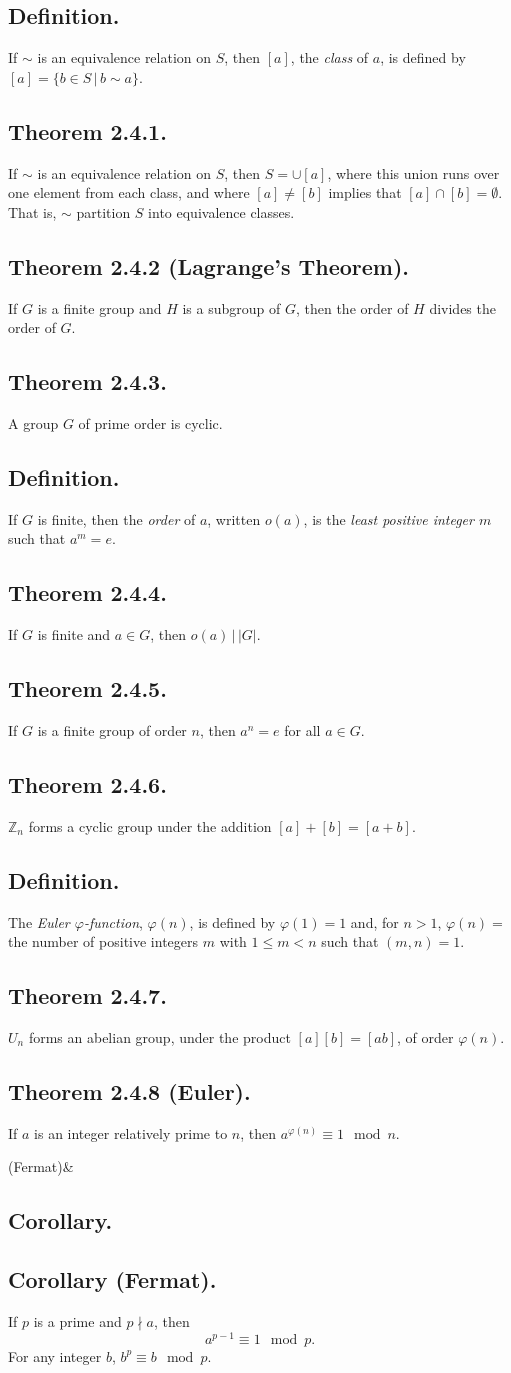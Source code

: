 \documentclass{article}
\newenvironment{thm}[1]{\subsection*{Theorem #1.}}{}
\newenvironment{defn}{\subsection*{Definition.}}{}
\newenvironment{corollary}[1]{
    \def\temp{#1}\def\null{&}\ifx\temp\null
        \subsection*{Corollary.}
    \else
        \subsection*{Corollary #1.}
    \fi
    
}{}
\newcommand*{\Z}{\mathbb{Z}}
\begin{document}
\begin{defn}
    If $\sim$ is an equivalence relation on $S$, then $[a]$, 
    the \textit{class} of $a$, is defined by $[a] = \{b \in S \, | \, b \sim a\}$.
\end{defn}

\begin{thm}{2.4.1}
    If $\sim$ is an equivalence relation on $S$, then $S = \cup[a]$,
    where this union runs over one element from each class, and where $[a] \neq [b]$
    implies that $[a] \cap [b] = \emptyset$. That is, $\sim$ partition $S$ into equivalence classes.
\end{thm}

\begin{thm}{2.4.2 (Lagrange's Theorem)}
    If $G$ is a finite group and $H$ is a subgroup of $G$, then the order of $H$ divides the order of $G$.
\end{thm}

\begin{thm}{2.4.3}
    A group $G$ of prime order is cyclic.
\end{thm}

\begin{defn}
    If $G$ is finite, then the \textit{order} of $a$, written $o(a)$, 
    is the \textit{least positive integer $m$} such that $a^m = e$.
\end{defn}

\begin{thm}{2.4.4}
    If $G$ is finite and $a \in G$, then $o(a) \, | \, |G|$.
\end{thm}

\begin{thm}{2.4.5}
    If $G$ is a finite group of order $n$, then $a^n = e$ for all $a \in G$.
\end{thm}

\begin{thm}{2.4.6}
    $\Z_n$ forms a cyclic group under the addition $[a] + [b] = [a + b]$.
\end{thm}

\begin{defn}
    The \textit{Euler $\varphi$-function}, $\varphi(n)$, is defined by $\varphi(1) = 1$ and,
    for $n > 1$, $\varphi(n) = $ the number of positive integers $m$ with $1 \leq m < n$ such that $(m, n) = 1$.
\end{defn}

\begin{thm}{2.4.7}
    $U_n$ forms an abelian group, under the product $[a][b] = [ab]$, of order $\varphi(n)$.
\end{thm}

\begin{thm}{2.4.8 (Euler)}
    If $a$ is an integer relatively prime to $n$, then $a^{\varphi(n)} \equiv 1 \mod n$.
\end{thm}

\begin{corollary}{(Fermat)}
    If $p$ is a prime and $p \nmid a$, then
    \[
        a^{p-1} \equiv 1 \mod p.
    \]
    For any integer $b$, $b^p \equiv b \mod p$.
\end{corollary}
 
\end{document}
